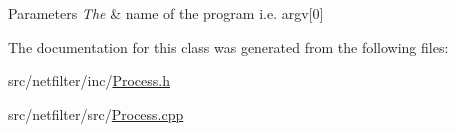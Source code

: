 \begin{DoxyParams}{Parameters}
{\em The} & name of the program i.\-e. argv\mbox{[}0\mbox{]} \\
\hline
\end{DoxyParams}


The documentation for this class was generated from the following files\-:\begin{DoxyCompactItemize}
\item 
src/netfilter/inc/\hyperlink{netfilter_2inc_2_process_8h}{Process.\-h}\item 
src/netfilter/src/\hyperlink{netfilter_2src_2_process_8cpp}{Process.\-cpp}\end{DoxyCompactItemize}
